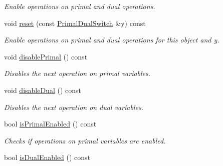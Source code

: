 \begin{DoxyCompactItemize}
\begin{DoxyCompactList}\small\item\em Enable operations on primal and dual operations. \end{DoxyCompactList}\item 
\hypertarget{classSpacy_1_1Mixin_1_1PrimalDualSwitch_a8d9290958a7571e0b09c63c07ade91f3}{}void \hyperlink{classSpacy_1_1Mixin_1_1PrimalDualSwitch_a8d9290958a7571e0b09c63c07ade91f3}{reset} (const \hyperlink{classSpacy_1_1Mixin_1_1PrimalDualSwitch_aad338d204eae400484cf23e474c06c7f}{Primal\+Dual\+Switch} \&y) const \label{classSpacy_1_1Mixin_1_1PrimalDualSwitch_a8d9290958a7571e0b09c63c07ade91f3}

\begin{DoxyCompactList}\small\item\em Enable operations on primal and dual operations for this object and y. \end{DoxyCompactList}\item 
\hypertarget{classSpacy_1_1Mixin_1_1PrimalDualSwitch_af6d731770318c8dbee103f11038b45bd}{}void \hyperlink{classSpacy_1_1Mixin_1_1PrimalDualSwitch_af6d731770318c8dbee103f11038b45bd}{disable\+Primal} () const \label{classSpacy_1_1Mixin_1_1PrimalDualSwitch_af6d731770318c8dbee103f11038b45bd}

\begin{DoxyCompactList}\small\item\em Disables the next operation on primal variables. \end{DoxyCompactList}\item 
\hypertarget{classSpacy_1_1Mixin_1_1PrimalDualSwitch_a09c50ff45a46f2a472860ef34911441b}{}void \hyperlink{classSpacy_1_1Mixin_1_1PrimalDualSwitch_a09c50ff45a46f2a472860ef34911441b}{disable\+Dual} () const \label{classSpacy_1_1Mixin_1_1PrimalDualSwitch_a09c50ff45a46f2a472860ef34911441b}

\begin{DoxyCompactList}\small\item\em Disables the next operation on dual variables. \end{DoxyCompactList}\item 
\hypertarget{classSpacy_1_1Mixin_1_1PrimalDualSwitch_a2bf4b6817c958a3ec9aafac8fa7d3204}{}bool \hyperlink{classSpacy_1_1Mixin_1_1PrimalDualSwitch_a2bf4b6817c958a3ec9aafac8fa7d3204}{is\+Primal\+Enabled} () const \label{classSpacy_1_1Mixin_1_1PrimalDualSwitch_a2bf4b6817c958a3ec9aafac8fa7d3204}

\begin{DoxyCompactList}\small\item\em Checks if operations on primal variables are enabled. \end{DoxyCompactList}\item 
\hypertarget{classSpacy_1_1Mixin_1_1PrimalDualSwitch_ac4900bd28aaafd6edd46aecc7ec945f0}{}bool \hyperlink{classSpacy_1_1Mixin_1_1PrimalDualSwitch_ac4900bd28aaafd6edd46aecc7ec945f0}{is\+Dual\+Enabled} () const \label{classSpacy_1_1Mixin_1_1PrimalDualSwitch_ac4900bd28aaafd6edd46aecc7ec945f0}


\end{DoxyCompactItemize}
